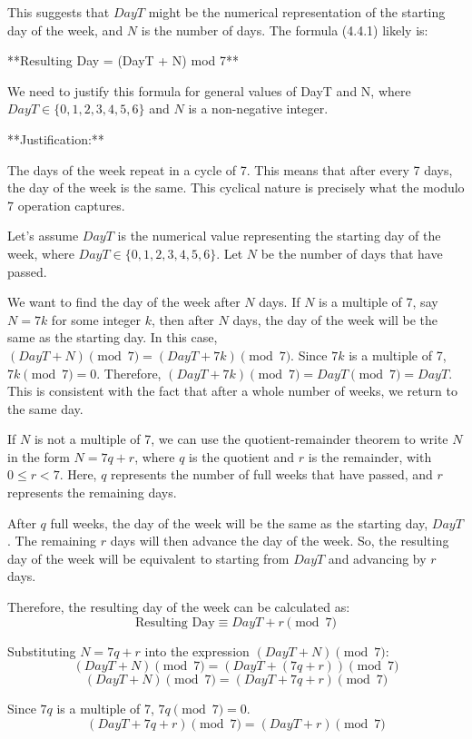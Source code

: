 \documentclass{article}
\begin{document}
This suggests that $DayT$ might be the numerical representation of the starting day of the week, and $N$ is the number of days. The formula (4.4.1) likely is:

**Resulting Day = (DayT + N) mod 7**

We need to justify this formula for general values of DayT and N, where $DayT \in \{0, 1, 2, 3, 4, 5, 6\}$ and $N$ is a non-negative integer.

**Justification:**

The days of the week repeat in a cycle of 7. This means that after every 7 days, the day of the week is the same. This cyclical nature is precisely what the modulo 7 operation captures.

Let's assume $DayT$ is the numerical value representing the starting day of the week, where $DayT \in \{0, 1, 2, 3, 4, 5, 6\}$.
Let $N$ be the number of days that have passed.

We want to find the day of the week after $N$ days.
If $N$ is a multiple of 7, say $N = 7k$ for some integer $k$, then after $N$ days, the day of the week will be the same as the starting day. In this case, $(DayT + N) \pmod{7} = (DayT + 7k) \pmod{7}$. Since $7k$ is a multiple of 7, $7k \pmod{7} = 0$. Therefore, $(DayT + 7k) \pmod{7} = DayT \pmod{7} = DayT$. This is consistent with the fact that after a whole number of weeks, we return to the same day.

If $N$ is not a multiple of 7, we can use the quotient-remainder theorem to write $N$ in the form $N = 7q + r$, where $q$ is the quotient and $r$ is the remainder, with $0 \le r < 7$.
Here, $q$ represents the number of full weeks that have passed, and $r$ represents the remaining days.

After $q$ full weeks, the day of the week will be the same as the starting day, $DayT$.
The remaining $r$ days will then advance the day of the week.
So, the resulting day of the week will be equivalent to starting from $DayT$ and advancing by $r$ days.

Therefore, the resulting day of the week can be calculated as:
$$ \text{Resulting Day} \equiv DayT + r \pmod{7} $$

Substituting $N = 7q + r$ into the expression $(DayT + N) \pmod{7}$:
$$ (DayT + N) \pmod{7} = (DayT + (7q + r)) \pmod{7} $$
$$ (DayT + N) \pmod{7} = (DayT + 7q + r) \pmod{7} $$

Since $7q$ is a multiple of 7, $7q \pmod{7} = 0$.
$$ (DayT + 7q + r) \pmod{7} = (DayT + r) \pmod{7} $$
\end{document}
